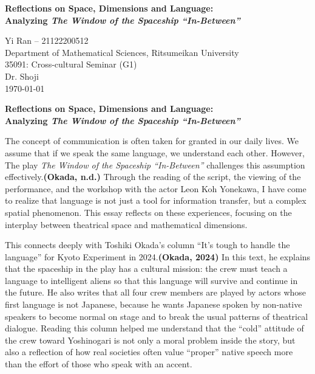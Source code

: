\documentclass[12pt]{article}
\newcommand{\myTitle}{Reflections on Space, Dimensions and Language: \\Analyzing \textit{The Window of the Spaceship ``In-Between''}}
\newcommand{\myAuthor}{Yi Ran -- 21122200512}
\newcommand{\myAffiliation}{Department of Mathematical Sciences, Ritsumeikan University}
\newcommand{\myCourse}{35091: Cross-cultural Seminar (G1)}
\newcommand{\myInstructor}{Dr. Shoji}
\newcommand{\myDate}{\today}
\begin{document}
\begin{center}
    \vspace*{3cm} 
    
    \textbf{\Large \myTitle} 
    
    \vspace{2\baselineskip} 
    
    \myAuthor \\
    \myAffiliation \\
    \myCourse \\
    \myInstructor \\
    \myDate
\end{center}

\newpage 


\begin{center}
    \textbf{\myTitle}
\end{center}
\vspace{\baselineskip} 

The concept of communication is often taken for granted in our daily lives. We assume that if we speak the same language, we understand each other. However, The play \textit{The Window of the Spaceship ``In-Between''} challenges this assumption effectively.\textbf{(Okada, n.d.)} Through the reading of the script, the viewing of the performance, and the workshop with the actor Leon Koh Yonekawa, I have come to realize that language is not just a tool for information transfer, but a complex spatial phenomenon. This essay reflects on these experiences, focusing on the interplay between theatrical space and mathematical dimensions.

This connects deeply with Toshiki Okada’s column “It’s tough to handle the language” for Kyoto Experiment in 2024.\textbf{(Okada, 2024)} In this text, he explains that the spaceship in the play has a cultural mission: the crew must teach a language to intelligent aliens so that this language will survive and continue in the future. He also writes that all four crew members are played by actors whose first language is not Japanese, because he wants Japanese spoken by non-native speakers to become normal on stage and to break the usual patterns of theatrical dialogue. Reading this column helped me understand that the “cold” attitude of the crew toward Yoshinogari is not only a moral problem inside the story, but also a reflection of how real societies often value “proper” native speech more than the effort of those who speak with an accent.
\end{document}
